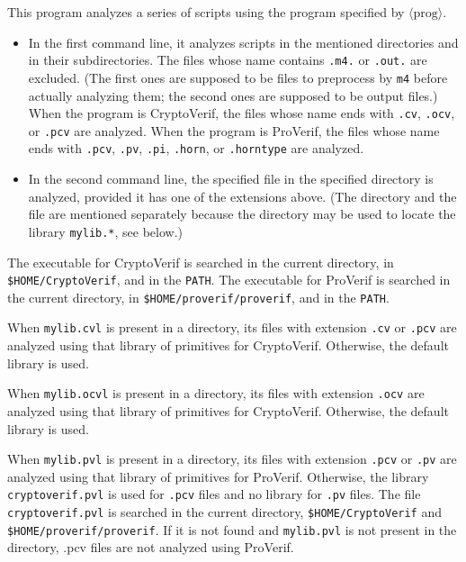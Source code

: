 \documentclass{article}
\newcommand{\nonterm}[1]{\langle\textrm{#1}\rangle}
\begin{document}
This program analyzes a series of scripts using the program specified by $\nonterm{prog}$.
\begin{itemize}

\item In the first command line, it analyzes scripts in the mentioned directories and in their subdirectories.
  The files whose name contains \texttt{.m4.} or \texttt{.out.} are excluded. (The first ones are supposed to be files
  to preprocess by \texttt{m4} before actually analyzing them; the second ones are supposed to be output files.)
  When the program is CryptoVerif, the files whose name ends with \texttt{.cv}, \texttt{.ocv}, or \texttt{.pcv} are
  analyzed. When the program is ProVerif, the files whose name ends with \texttt{.pcv}, \texttt{.pv}, \texttt{.pi},
  \texttt{.horn}, or \texttt{.horntype} are analyzed.

\item In the second command line, the specified file in the specified directory is analyzed, provided it has one of the extensions above. (The directory and the file are mentioned separately because the directory may be used to locate the library \texttt{mylib.*}, see below.)

\end{itemize}
The executable for CryptoVerif is searched in the current directory, in \texttt{\$HOME/CryptoVerif}, and in the \texttt{PATH}. The executable for ProVerif is searched in the current directory, in \texttt{\$HOME/proverif/proverif}, and in the \texttt{PATH}.

When \texttt{mylib.cvl} is present in a directory, its files with extension \texttt{.cv} or \texttt{.pcv} are analyzed
using that library of primitives for CryptoVerif. Otherwise, the default library is used.

When \texttt{mylib.ocvl} is present in a directory, its files with extension \texttt{.ocv} are analyzed
using that library of primitives for CryptoVerif. Otherwise, the default library is used.

When \texttt{mylib.pvl} is present in a directory, its files with extension \texttt{.pcv} or \texttt{.pv} are analyzed
using that library of primitives for ProVerif. Otherwise, the library \texttt{cryptoverif.pvl} is used for \texttt{.pcv} files and no library for \texttt{.pv} files. The file \texttt{cryptoverif.pvl} is searched in the current directory, \texttt{\$HOME/CryptoVerif} and \texttt{\$HOME/proverif/proverif}. If it is not found and \texttt{mylib.pvl} is not present in the directory, {.pcv} files are not analyzed using ProVerif.
\end{document}
